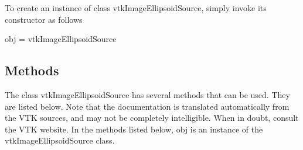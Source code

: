 To create an instance of class vtk\-Image\-Ellipsoid\-Source, simply invoke its constructor as follows \begin{DoxyVerb}  obj = vtkImageEllipsoidSource
\end{DoxyVerb}
 \hypertarget{vtkwidgets_vtkxyplotwidget_Methods}{}\subsection{Methods}\label{vtkwidgets_vtkxyplotwidget_Methods}
The class vtk\-Image\-Ellipsoid\-Source has several methods that can be used. They are listed below. Note that the documentation is translated automatically from the V\-T\-K sources, and may not be completely intelligible. When in doubt, consult the V\-T\-K website. In the methods listed below, {\ttfamily obj} is an instance of the vtk\-Image\-Ellipsoid\-Source class. 
